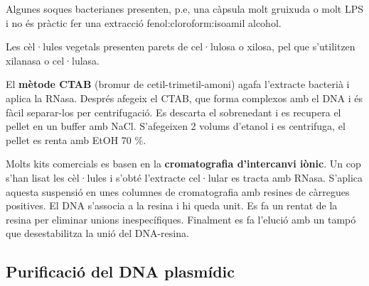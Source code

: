 Algunes soques bacterianes presenten, p.e, una càpsula molt gruixuda o
molt LPS i no és pràctic fer una extracció fenol:cloroform:isoamil
alcohol.

Les cèl·lules vegetals presenten parets de cel·lulosa o xilosa, pel
que s'utilitzen xilanasa o cel·lulasa.

El \textbf{mètode CTAB} (bromur de cetil-trimetil-amoni) agafa l'extracte
bacterià i aplica la RNasa. Després afegeix el CTAB, que forma
complexos amb el DNA i és fàcil separar-los per centrifugació. Es
descarta el sobrenedant i es recupera el pellet en un buffer amb
NaCl. S'afegeixen 2 volums d'etanol i es centrifuga, el pellet es
renta amb EtOH 70 \%.

Molts kits comercials es basen en la \textbf{cromatografia
  d'intercanvi iònic}. Un cop s'han lisat les cèl·lules i s'obté
l'extracte cel·lular es tracta amb RNasa. S'aplica aquesta suspensió
en unes columnes de cromatografia amb resines de càrregues
positives. El DNA s'associa  a la resina i hi queda unit. Es fa un
rentat de la resina per eliminar unions inespecífiques. Finalment es
fa l'elució amb un tampó que desestabilitza la unió del DNA-resina.

\subsection{Purificació del DNA plasmídic}
